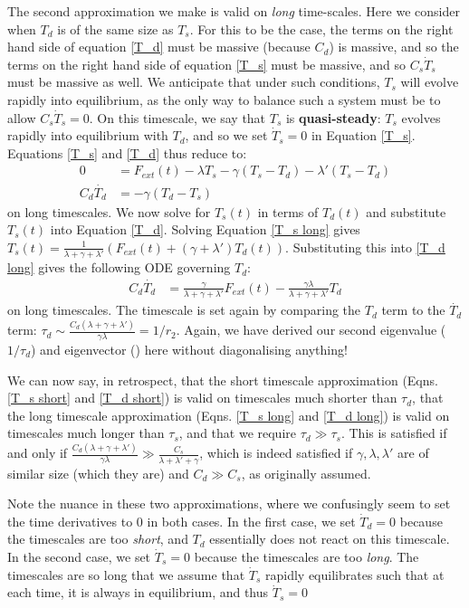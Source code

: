 The second approximation we make is valid on \textit{long} time-scales. Here we consider when $T_d$ is of the same size as $T_s$. For this to be the case, the terms on the right hand side of equation \ref{T_d} must be massive (because $C_d$) is massive, and so the terms on the right hand side of equation \ref{T_s} must be massive, and so $C_s \dot T_s$ must be massive as well. We anticipate that under such conditions, $T_s$ will evolve rapidly into equilibrium, as the only way to balance such a system must be to allow $C_s \dot T_s=0$. On this timescale, we say that $T_s$ is \textbf{quasi-steady}: $T_s$ evolves rapidly into equilibrium with $T_d$, and so we set $\dot T_s=0$ in Equation \ref{T_s}. Equations \ref{T_s} and \ref{T_d} thus reduce to:
\begin{align}
    0 & = F_{ext}(t)-\lambda T_s -\gamma (T_s-T_d) - \lambda'(T_s-T_d) \label{T_s long} \\ 
    C_d \dot{T_d} &= -\gamma (T_d-T_s) \label{T_d long}
\end{align}
on long timescales. We now solve for $T_s(t)$ in terms of $T_d(t)$ and substitute $T_s(t)$ into Equation \ref{T_d}. Solving Equation \ref{T_s long} gives $T_s(t)=\frac{1}{\lambda+\gamma+\lambda'}\left(F_{ext}(t)+(\gamma+\lambda ')T_d(t)\right)$. Substituting this into \ref{T_d long} gives the following ODE governing $T_d$:
\begin{align}
    C_d \dot{T_d} &= \frac{\gamma}{\lambda+\gamma+\lambda'}F_{ext}(t) - \frac{\gamma\lambda}{\lambda+\gamma+\lambda'}T_d\label{T_d long T_s} 
\end{align}
on long timescales. The timescale is set again by comparing the $T_d$ term to the $\dot{T_d}$ term: $\tau_d\sim \frac{C_d(\lambda+\gamma+\lambda')}{\gamma\lambda}=1/r_2$. Again, we have derived our second eigenvalue ($1/\tau_d$) and eigenvector () here without diagonalising anything!

We can now say, in retrospect, that the short timescale approximation (Eqns. \ref{T_s short} and \ref{T_d short}) is valid on timescales much shorter than $\tau_d$, that the long timescale approximation (Eqns. \ref{T_s long} and \ref{T_d long}) is valid on timescales much longer than $\tau_s$, and that we require $\tau_d\gg \tau_s$. This is satisfied if and only if $\frac{C_d(\lambda+\gamma+\lambda')}{\gamma\lambda}\gg\frac{C_s}{\lambda+\lambda'+\gamma}$, which is indeed satisfied if $\gamma,\lambda,\lambda'$ are of similar size (which they are) and $C_d\gg C_s$, as originally assumed.

Note the nuance in these two approximations, where we confusingly seem to set the time derivatives to $0$ in both cases. In the first case, we set $\dot T_d=0$ because the timescales are too \textit{short}, and $T_d$ essentially does not react on this timescale. In the second case, we set $\dot T_s=0$ because the timescales are too \textit{long}. The timescales are so long that we assume that $\dot T_s$ rapidly equilibrates such that at each time, it is always in equilibrium, and thus $\dot T_s=0$

